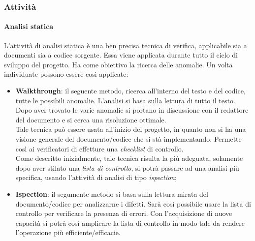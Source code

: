 		\subsubsection{Attività}

			\paragraph{Analisi statica} %
			\label{par:analisi_statica}
			L'attività di analisi statica è una ben precisa tecnica di verifica, applicabile sia a documenti sia a codice sorgente. Essa viene applicata durante tutto il ciclo di sviluppo del progetto. Ha come obiettivo la ricerca delle anomalie. Un volta individuate possono essere così applicate:
			\begin{itemize}
				\item \textbf{Walkthrough}: il seguente metodo, ricerca all'interno del testo e del codice, tutte le possibili anomalie. L'analisi si basa sulla lettura di tutto il testo.\\
				Dopo aver trovato le varie anomalie si portano in discussione con il redattore del documento e si cerca una risoluzione ottimale.\\
				Tale tecnica può essere usata all'inizio del progetto, in quanto non si ha una visione generale del documento/codice che si stà implementando. Permette così ai verificatori di effetture una \emph{checklist} di controllo.\\
				Come descritto inizialmente, tale tecnica risulta la più adeguata, solamente dopo aver stilato una \emph{lista di controllo}, si potrà passare ad una analisi più specifica, usando l'attività di analisi di tipo \emph{ispection};
				\item \textbf{Ispection}: il segumente metodo si basa sulla lettura mirata del documento/codice per analizzarne i difetti. Sarà così possibile usare la lista di controllo per verificare la presenza di errori. Con l'acquisizione di nuove capacità si potrà così amplicare la lista di controllo in modo tale da rendere l'operazione più efficiente/efficacie.
			\end{itemize}
			
